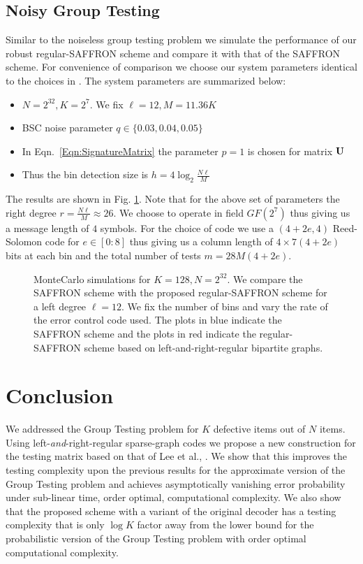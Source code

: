\subsection*{Noisy Group Testing}
Similar to the noiseless group testing problem we simulate the performance of our robust regular-SAFFRON scheme and compare it with that of the SAFFRON scheme. For convenience of comparison we choose our system parameters identical to the choices in \cite{lee2015saffron}. The system parameters are summarized below:
\begin{itemize}
\item $N=2^{32}, K=2^7$. We fix $\ell=12, M=11.36K$ 
\item BSC noise parameter $q\in\{0.03,0.04,0.05\}$
\item In Eqn.~\ref{Eqn:SignatureMatrix} the parameter $p=1$ is chosen for matrix $\mathbf{U}$
\item Thus the bin detection size is $h=4\log_2 \frac{N\ell}{M}$
\end{itemize}
The results are shown in Fig. \ref{Fig:SimulationNoisy}. Note that for the above set of parameters the right degree $r=\frac{N\ell}{M}\approx 26$. We choose to operate in field $GF(2^7)$ thus giving us a message length of $4$ symbols. For the choice of code we use a $(4+2e,4)$ Reed-Solomon code for $e\in[0:8]$ thus giving us a column length of $4\times 7(4+2e)$ bits at each bin and the total number of tests $m=28M(4+2e)$.

\begin{figure}[t!]
\centering

\caption{MonteCarlo simulations for $K=128, N=2^{32}$. We compare the SAFFRON scheme with the proposed regular-SAFFRON scheme for a left degree $\ell=12$. We fix the number of bins and vary the rate of the error control code used. The plots in blue indicate the SAFFRON scheme\cite{lee2015saffron} and the plots in red indicate the regular-SAFFRON scheme based on left-and-right-regular bipartite graphs.}
\label{Fig:SimulationNoisy}
\end{figure}

\section{Conclusion}
We addressed the Group Testing problem for $K$ defective items out of $N$ items. Using left-\emph{and}-right-regular sparse-graph codes we propose a new construction for the testing matrix based on that of Lee et al., \cite{lee2015saffron}. We show that this improves the testing complexity upon the previous results for the approximate version of the Group Testing problem and achieves asymptotically vanishing error probability under sub-linear time, order optimal, computational complexity. We also show that the proposed scheme with a variant of the original decoder has a testing complexity that is only $\log K$ factor away from the lower bound for the probabilistic version of the Group Testing problem with order optimal computational complexity.

%
%
% 
